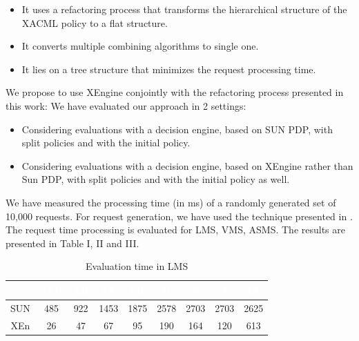 \begin{itemize}
\item It uses a refactoring process that transforms the hierarchical structure of the XACML policy to a flat structure. 
\item It converts multiple combining algorithms to single one.
\item It lies on a tree structure that minimizes the request processing time.
\end{itemize}
We propose to use XEngine conjointly with the refactoring process presented in this work:
We have evaluated our approach in 2 settings:
\begin{itemize}
\item Considering evaluations with a decision engine, based on SUN PDP, with split policies and with the initial policy.  
\item Considering evaluations with a decision engine, based on XEngine rather than Sun PDP, with split policies and with the initial policy as well.  
\end{itemize}

We have measured the processing time (in ms) of a randomly generated set of 10,000 requests. For request generation, we have used the technique presented 
in \cite{request}. The request time processing is evaluated for LMS, VMS, ASMS. The results are presented in Table I, II and III.

\begin{table}[h!]
\centering
\begin{tabular}{|>{\tiny}c|>{\tiny}c|>{\tiny}c|>{\tiny}c|>{\tiny}c|>{\tiny}c|>{\tiny}c|>{\tiny}c|>{\tiny}c|}   
\hline  \rowcolor{black} \scriptsize \bf \textcolor {white}{}
& \scriptsize \bf \textcolor {white}{SAR}
& \scriptsize \bf \textcolor {white}{AR}
& \scriptsize \bf \textcolor  {white}{SA}
& \scriptsize \bf \textcolor  {white}{SR}
& \scriptsize \bf \textcolor  {white}{R}

& \scriptsize \bf \textcolor  {white}{S} 
& \scriptsize \bf \textcolor  {white}{A}
& \scriptsize \bf \textcolor {white}{IA}\\ \hline
\scriptsize  {SUN }
&\scriptsize  {485}
& \scriptsize {922}
& \scriptsize {1453}
& \scriptsize {1875}
& \scriptsize {2578}

& \scriptsize {2703}
& \scriptsize {2703}
& \scriptsize {2625}
  \\ \hline
\scriptsize  {XEn}
&\scriptsize  {26}
& \scriptsize {47}
& \scriptsize {67}
& \scriptsize {95}
& \scriptsize {190}

& \scriptsize {164}
& \scriptsize {120}
& \scriptsize {613}
  \\ \hline
\end{tabular}
\caption{Evaluation time in LMS}\end{table}



